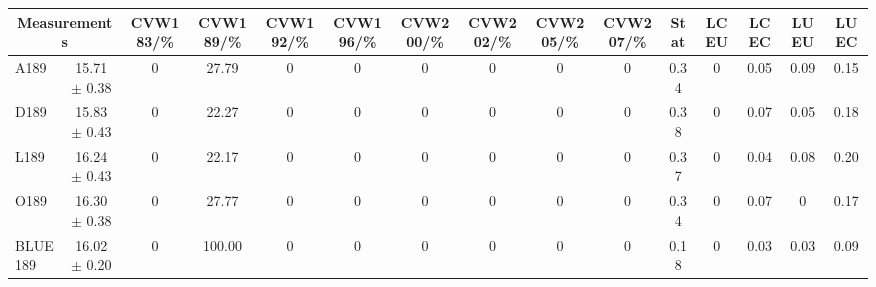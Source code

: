 \begin{table}[H]
\scriptsize
\begin{center}
\renewcommand{\arraystretch}{1.1}
\begin{tabular}{|lc|c|c|c|c|c|c|c|c|ccccc|}
\hline
\multicolumn{2}{|c|}{Measurements} & CVW{\tiny 183}/\%  & CVW{\tiny 189}/\%  & CVW{\tiny 192}/\%  & CVW{\tiny 196}/\%  & CVW{\tiny 200}/\%  & CVW{\tiny 202}/\%  & CVW{\tiny 205}/\%  & CVW{\tiny 207}/\%  & {\tiny Stat} & {\tiny LCEU} & {\tiny LCEC} & {\tiny LUEU} & {\tiny LUEC}\\
\hline
A189 &      15.71 $\pm$       0.38 &  0 &      27.79 &  0 &  0 &  0 &  0 &  0 &  0 &       0.34 &  0 &       0.05 &       0.09 &       0.15\\
D189 &      15.83 $\pm$       0.43 &  0 &      22.27 &  0 &  0 &  0 &  0 &  0 &  0 &       0.38 &  0 &       0.07 &       0.05 &       0.18\\
L189 &      16.24 $\pm$       0.43 &  0 &      22.17 &  0 &  0 &  0 &  0 &  0 &  0 &       0.37 &  0 &       0.04 &       0.08 &       0.20\\
O189 &      16.30 $\pm$       0.38 &  0 &      27.77 &  0 &  0 &  0 &  0 &  0 &  0 &       0.34 &  0 &       0.07 &  0 &       0.17\\
\hline
BLUE {\tiny 189} &      16.02 $\pm$       0.20 &  0 &     100.00 &  0 &  0 &  0 &  0 &  0 &  0 &       0.18 &  0 &       0.03 &       0.03 &       0.09\\
\hline
\end{tabular}
\renewcommand{\arraystretch}{1}
\end{center}
\end{table}
\vspace*{-0.5cm}
